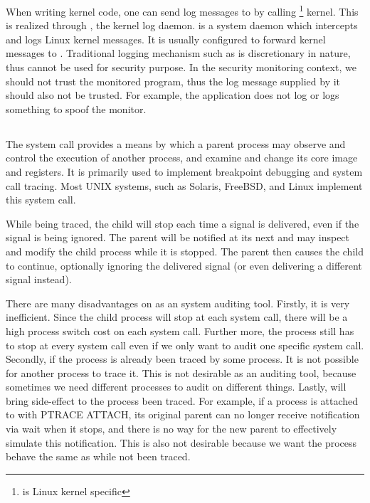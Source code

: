 When writing kernel code, one can send log messages to  by calling
\footnote{ is Linux kernel specific} kernel.  This is
realized through , the kernel log daemon.   is a system
daemon which intercepts and logs Linux kernel messages. It is usually
configured to forward kernel messages to . Traditional logging
mechanism such as  is discretionary in nature, thus cannot be used
for security purpose. In the security monitoring context, we should not trust
the monitored program, thus the log message supplied by it should also not be
trusted. For example, the application does not log or logs something to spoof
the monitor.

\subsection{}

The  system call provides a means by which a parent process may
observe and control the execution of another process, and examine and change
its core image and registers. It is primarily used to implement breakpoint
debugging and system call tracing. Most UNIX systems, such as Solaris, FreeBSD,
and Linux implement this system call.

While being traced, the child will stop
each time a signal is delivered, even if the signal is being ignored. The
parent will be notified at its next  and may inspect and modify the
child process while it is stopped. The parent then causes the child to
continue, optionally ignoring the delivered signal (or even delivering a
different signal instead).

There are many disadvantages on  as an system
auditing tool. Firstly, it is very inefficient. Since the child process will
stop at each system call, there will be a high process switch cost on each
system call. Further more, the process still has to stop at every system call
even if we only want to audit one specific system call. Secondly, if the
process is already been traced by some process. It is not possible for another
process to trace it. This is not desirable as an auditing tool, because
sometimes we need different processes to audit on different things. Lastly,
 will bring side-effect to the process been traced. For example, if a
process is attached to with PTRACE ATTACH, its original parent can no longer
receive notification via wait when it stops, and there is no way for the new
parent to effectively simulate this notification. This is also not desirable
because we want the process behave the same as while not been traced.

